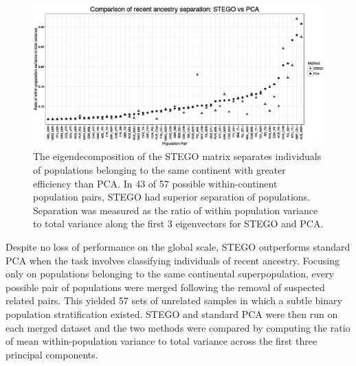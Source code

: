 \begin{figure}
\includegraphics[width=1\columnwidth]{./figures/figure4_bw.eps}
\caption[Eigendecomposition separation using STEGO matrix and covariance]{The eigendecomposition of the STEGO matrix separates individuals of populations belonging to the same continent with greater efficiency than PCA. In 43 of 57 possible within-continent population pairs, STEGO had superior separation of populations. Separation was measured as the ratio of within population variance to total variance along the first 3 eigenvectors for STEGO and PCA. }
\label{fig: pairwise_variances}
\end{figure}

Despite no loss of performance on the global scale, STEGO outperforms standard PCA when the task involves classifying
individuals of recent ancestry. Focusing only on populations belonging
to the same continental superpopulation, every possible pair of populations were
merged following the removal of suspected related pairs. This yielded 57 sets of unrelated samples in which a subtle binary population stratification existed. STEGO and
standard PCA were then run on each merged dataset and the two methods
were compared by computing the ratio of mean within-population variance
to total variance across the first three principal components. 

